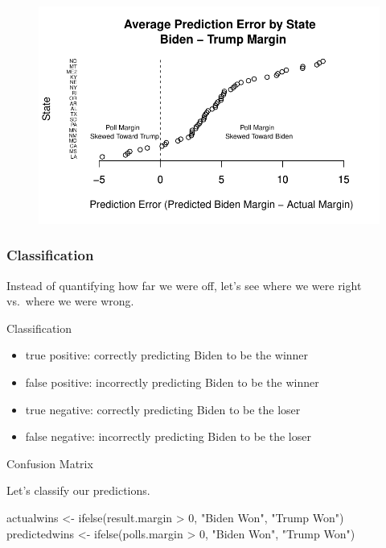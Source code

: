 \documentclass[
  letterpaper,
  DIV=11,
  numbers=noendperiod]{scrreprt}
\newenvironment{Shaded}{\begin{snugshade}}{\end{snugshade}}
\newcommand{\DecValTok}[1]{\textcolor[rgb]{0.68,0.00,0.00}{#1}}
\newcommand{\FunctionTok}[1]{\textcolor[rgb]{0.28,0.35,0.67}{#1}}
\newcommand{\NormalTok}[1]{\textcolor[rgb]{0.00,0.23,0.31}{#1}}
\newcommand{\OtherTok}[1]{\textcolor[rgb]{0.00,0.23,0.31}{#1}}
\newcommand{\SpecialCharTok}[1]{\textcolor[rgb]{0.37,0.37,0.37}{#1}}
\newcommand{\StringTok}[1]{\textcolor[rgb]{0.13,0.47,0.30}{#1}}
\providecommand{\tightlist}{%
  \setlength{\itemsep}{0pt}\setlength{\parskip}{0pt}}\usepackage{longtable,booktabs,array}
\begin{document}
\begin{figure}[H]

{\centering \includegraphics{07-Prediction_files/figure-pdf/unnamed-chunk-16-1.pdf}

}

\end{figure}

\hypertarget{classification}{%
\subsubsection{Classification}\label{classification}}

Instead of quantifying how far we were off, let's see where we were
right vs.~where we were wrong.

Classification

\begin{itemize}
\tightlist
\item
  true positive: correctly predicting Biden to be the winner
\item
  false positive: incorrectly predicting Biden to be the winner
\item
  true negative: correctly predicting Biden to be the loser
\item
  false negative: incorrectly predicting Biden to be the loser
\end{itemize}

Confusion Matrix

Let's classify our predictions.

\begin{Shaded}
\begin{Highlighting}[]
\NormalTok{actualwins }\OtherTok{\textless{}{-}} \FunctionTok{ifelse}\NormalTok{(result.margin }\SpecialCharTok{\textgreater{}} \DecValTok{0}\NormalTok{, }\StringTok{"Biden Won"}\NormalTok{, }\StringTok{"Trump Won"}\NormalTok{)}
\NormalTok{predictedwins }\OtherTok{\textless{}{-}} \FunctionTok{ifelse}\NormalTok{(polls.margin }\SpecialCharTok{\textgreater{}} \DecValTok{0}\NormalTok{, }\StringTok{"Biden Won"}\NormalTok{, }\StringTok{"Trump Won"}\NormalTok{)}
\end{Highlighting}
\end{Shaded}
\end{document}
